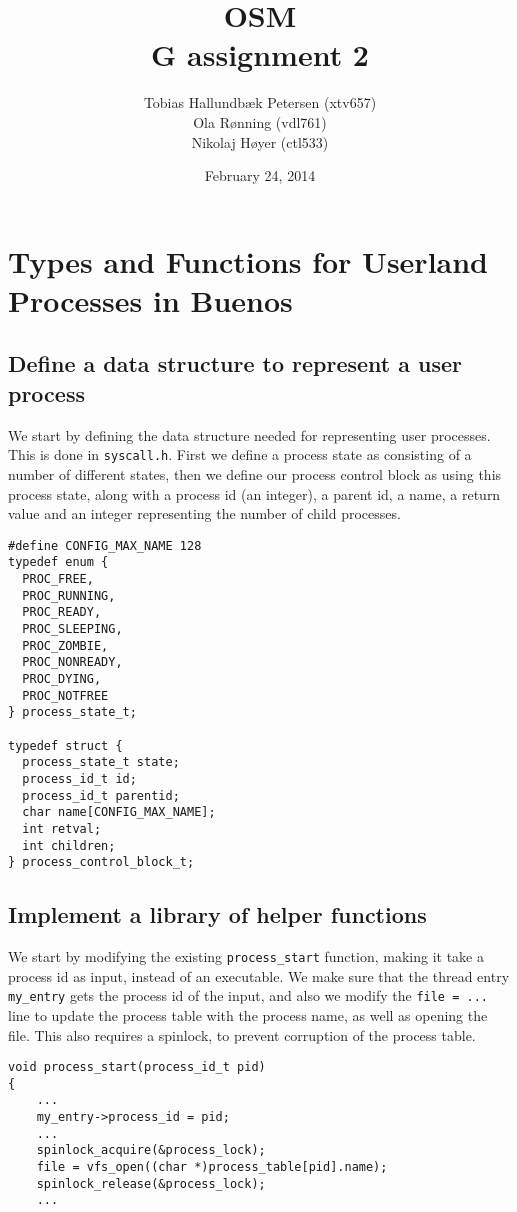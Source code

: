 \documentclass[a4paper,12pt]{article}
\title{OSM\\G assignment 2}
\author{Tobias Hallundbæk Petersen (xtv657)\\Ola Rønning (vdl761)\\Nikolaj Høyer (ctl533)}
\date{February 24, 2014}
\begin{document}
\maketitle
\tableofcontents
\newpage
\section{Types and Functions for Userland Processes in Buenos}
\subsection{Define a data structure to represent a user process}

We start by defining the data structure needed for representing user processes. This is done in \texttt{syscall.h}. First we define a process state as consisting of a number of different states, then we define our process control block as using this process state, along with a process id (an integer), a parent id, a name, a return value and an integer representing the number of child processes.
\begin{lstlisting}
#define CONFIG_MAX_NAME 128
typedef enum {
  PROC_FREE,
  PROC_RUNNING,
  PROC_READY,
  PROC_SLEEPING,
  PROC_ZOMBIE,
  PROC_NONREADY,
  PROC_DYING,
  PROC_NOTFREE
} process_state_t;

typedef struct {
  process_state_t state;
  process_id_t id;
  process_id_t parentid;
  char name[CONFIG_MAX_NAME];
  int retval;
  int children;
} process_control_block_t;
\end{lstlisting}

\subsection{Implement a library of helper functions}
We start by modifying the existing \texttt{process\_start} function, making it take a process id as input, instead of an executable. We make sure that the thread entry \texttt{my\_entry} gets the process id of the input, and also we modify the \texttt{file = ...} line to update the process table with the process name, as well as opening the file. This also requires a spinlock, to prevent corruption of the process table.
\begin{lstlisting}
void process_start(process_id_t pid)
{
    ...
    my_entry->process_id = pid;
    ...
    spinlock_acquire(&process_lock);
    file = vfs_open((char *)process_table[pid].name);
    spinlock_release(&process_lock);
    ...
\end{lstlisting}
\end{document}
